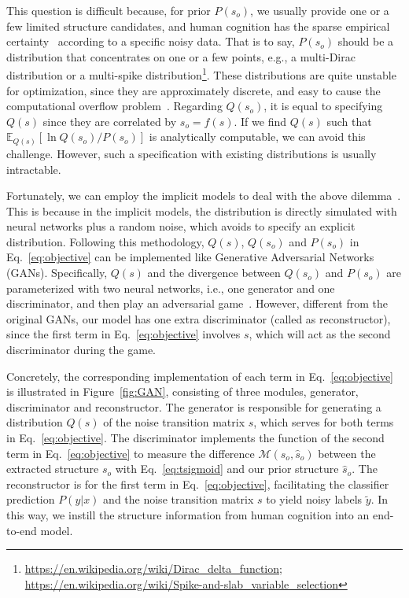 \documentclass{article}
\begin{document}
This question is difficult because, for prior $P(s_o)$, we usually provide one or a few limited structure candidates, and human cognition has the sparse empirical certainty~\cite{NelsonGoodman} according to a specific noisy data. That is to say, $P(s_o)$ should be a distribution that concentrates on one or a few points, e.g., a multi-Dirac distribution or a multi-spike distribution\footnote{\url{https://en.wikipedia.org/wiki/Dirac_delta_function}; \url{https://en.wikipedia.org/wiki/Spike-and-slab_variable_selection}}. These distributions are quite unstable for optimization, since they are approximately discrete, and easy to cause the computational overflow problem~\cite{2017arXiv170800085R}. Regarding $Q(s_o)$, it is equal to specifying $Q(s)$ since they are correlated by $s_o=f(s)$. If we find $Q(s)$ such that $\mathbb{E}_{Q(s)}\left[\ln{Q(s_o)\slash P(s_o)}\right]$ is analytically computable, we can avoid this challenge. However, such a specification with existing distributions is usually intractable.

Fortunately, we can employ the implicit models to deal with the above dilemma~\cite{implicit}. This is because in the implicit models, the distribution is directly simulated with neural networks plus a random noise, which avoids to specify an explicit distribution. Following this methodology, $Q(s)$, $Q(s_o)$ and $P(s_o)$ in Eq.~\eqref{eq:objective} can be implemented like Generative Adversarial Networks (GANs). Specifically, $Q(s)$ and the divergence between $Q(s_o)$ and $P(s_o)$ are parameterized with two neural networks, i.e., one generator and one discriminator, and then play an adversarial game~\cite{goodfellow2014generative}. However, different from the original GANs, our model has one extra discriminator (called as reconstructor), since the first term in Eq.~\eqref{eq:objective} involves $s$, which will act as the second discriminator during the game.

Concretely, the corresponding implementation of each term in Eq.~\eqref{eq:objective} is illustrated in Figure~\ref{fig:GAN}, consisting of three modules, generator, discriminator and reconstructor. The generator is responsible for generating a distribution $Q(s)$ of the noise transition matrix $s$, which serves for both terms in Eq.~\eqref{eq:objective}. The discriminator implements the function of the second term in Eq.~\eqref{eq:objective} to measure the difference $\mathcal{M}(s_o,\hat{s}_o)$ between the extracted structure $s_o$ with Eq.~\eqref{eq:tsigmoid} and our prior structure $\hat{s}_o$. The reconstructor is for the first term in Eq.~\eqref{eq:objective}, facilitating the classifier prediction $P(y|x)$ and the noise transition matrix $s$ to yield noisy labels $\tilde{y}$. In this way, we instill the structure information from human cognition into an end-to-end model.
\end{document}
